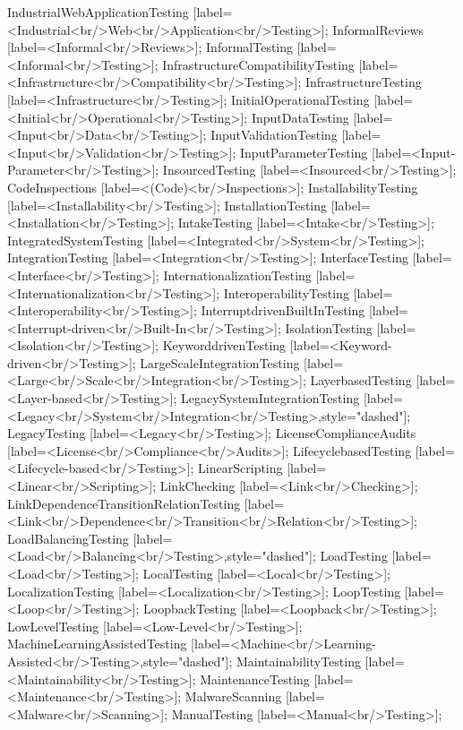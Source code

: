 \documentclass{article}
\begin{document}
{IndustrialWebApplicationTesting [label=<Industrial<br/>Web<br/>Application<br/>Testing>];
InformalReviews [label=<Informal<br/>Reviews>];
InformalTesting [label=<Informal<br/>Testing>];
InfrastructureCompatibilityTesting [label=<Infrastructure<br/>Compatibility<br/>Testing>];
InfrastructureTesting [label=<Infrastructure<br/>Testing>];
InitialOperationalTesting [label=<Initial<br/>Operational<br/>Testing>];
InputDataTesting [label=<Input<br/>Data<br/>Testing>];
InputValidationTesting [label=<Input<br/>Validation<br/>Testing>];
InputParameterTesting [label=<Input-Parameter<br/>Testing>];
InsourcedTesting [label=<Insourced<br/>Testing>];
CodeInspections [label=<(Code)<br/>Inspections>];
InstallabilityTesting [label=<Installability<br/>Testing>];
InstallationTesting [label=<Installation<br/>Testing>];
IntakeTesting [label=<Intake<br/>Testing>];
IntegratedSystemTesting [label=<Integrated<br/>System<br/>Testing>];
IntegrationTesting [label=<Integration<br/>Testing>];
InterfaceTesting [label=<Interface<br/>Testing>];
InternationalizationTesting [label=<Internationalization<br/>Testing>];
InteroperabilityTesting [label=<Interoperability<br/>Testing>];
InterruptdrivenBuiltInTesting [label=<Interrupt-driven<br/>Built-In<br/>Testing>];
IsolationTesting [label=<Isolation<br/>Testing>];
KeyworddrivenTesting [label=<Keyword-driven<br/>Testing>];
LargeScaleIntegrationTesting [label=<Large<br/>Scale<br/>Integration<br/>Testing>];
LayerbasedTesting [label=<Layer-based<br/>Testing>];
LegacySystemIntegrationTesting [label=<Legacy<br/>System<br/>Integration<br/>Testing>,style="dashed"];
LegacyTesting [label=<Legacy<br/>Testing>];
LicenseComplianceAudits [label=<License<br/>Compliance<br/>Audits>];
LifecyclebasedTesting [label=<Lifecycle-based<br/>Testing>];
LinearScripting [label=<Linear<br/>Scripting>];
LinkChecking [label=<Link<br/>Checking>];
LinkDependenceTransitionRelationTesting [label=<Link<br/>Dependence<br/>Transition<br/>Relation<br/>Testing>];
LoadBalancingTesting [label=<Load<br/>Balancing<br/>Testing>,style="dashed"];
LoadTesting [label=<Load<br/>Testing>];
LocalTesting [label=<Local<br/>Testing>];
LocalizationTesting [label=<Localization<br/>Testing>];
LoopTesting [label=<Loop<br/>Testing>];
LoopbackTesting [label=<Loopback<br/>Testing>];
LowLevelTesting [label=<Low-Level<br/>Testing>];
MachineLearningAssistedTesting [label=<Machine<br/>Learning-Assisted<br/>Testing>,style="dashed"];
MaintainabilityTesting [label=<Maintainability<br/>Testing>];
MaintenanceTesting [label=<Maintenance<br/>Testing>];
MalwareScanning [label=<Malware<br/>Scanning>];
ManualTesting [label=<Manual<br/>Testing>];
}
\end{document}
